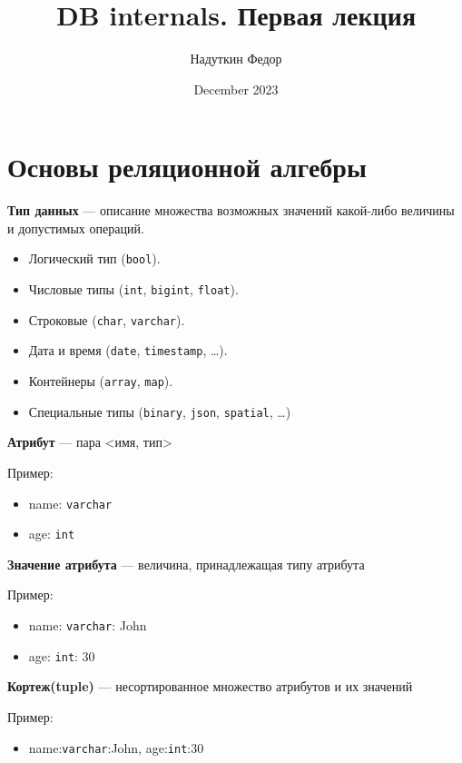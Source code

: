 \documentclass[11pt]{article}
\title{DB internals. Первая лекция}
\author{Надуткин Федор }
\date{December 2023}
\begin{document}
    \maketitle

    \newpage

    \section*{Основы реляционной алгебры}

    \textbf{Тип данных} --- описание множества возможных значений какой-либо величины и допустимых операций.

    \begin{itemize}
        \item Логический тип (\texttt{bool}).
        \item Числовые типы (\texttt{int}, \texttt{bigint}, \texttt{float}).
        \item Строковые (\texttt{char}, \texttt{varchar}).
        \item Дата и время (\texttt{date}, \texttt{timestamp}, \ldots).
        \item Контейнеры (\texttt{array}, \texttt{map}).
        \item Специальные типы (\texttt{binary}, \texttt{json}, \texttt{spatial}, \ldots)
    \end{itemize}

    \textbf{Атрибут} --- пара <имя, тип>

    Пример:
    \begin{itemize}
        \item name: \texttt{varchar}
        \item age: \texttt{int}
    \end{itemize}

    \textbf{Значение атрибута} --- величина, принадлежащая типу атрибута

    Пример:
    \begin{itemize}
        \item name: \texttt{varchar}: John
        \item age: \texttt{int}: 30
    \end{itemize}

    \textbf{Кортеж(tuple)} --- несортированное множество атрибутов и их значений

    Пример:
    \begin{itemize}
        \item \text{[} name:\texttt{varchar}:John, age:\texttt{int}:30 \text{]}
    \end{itemize}
\end{document}
